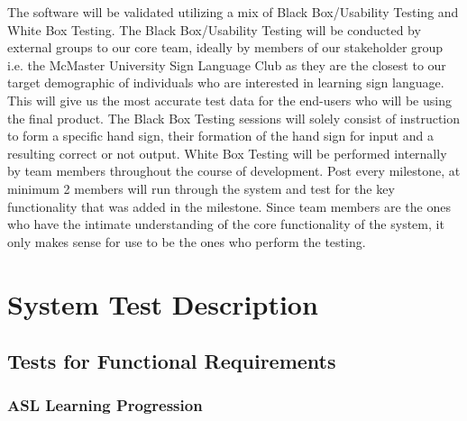 \documentclass[12pt, titlepage]{article}
\begin{document}
The software will be validated utilizing a mix of Black Box/Usability Testing and White Box Testing. The Black Box/Usability Testing will be conducted by external groups to our core team, ideally by members of our stakeholder group i.e. the McMaster University Sign Language Club as they are the closest to our target demographic of individuals who are interested in learning sign language. This will give us the most accurate test data for the end-users who will be using the final product. The Black Box Testing sessions will solely consist of instruction to form a specific hand sign, their formation of the hand sign for input and a resulting correct or not output. \newline 
\indent White Box Testing will be performed internally by team members throughout the course of development. Post every milestone, at minimum 2 members will run through the system and test for the key functionality that was added in the milestone. Since team members are the ones who have the intimate understanding of the core functionality of the system, it only makes sense for use to be the ones who perform the testing.

\section{System Test Description}
	
\subsection{Tests for Functional Requirements}

\subsubsection{ASL Learning Progression}
\end{document}
